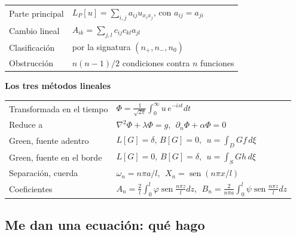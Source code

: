 \documentclass[
  spanish,
  a4paper,
]{scrbook}
\newcounter{none} %
\theoremstyle{definition}
\theoremstyle{plain}
\theoremstyle{definition}
\theoremstyle{plain}
\theoremstyle{definition}
\theoremstyle{remark}
\begin{document}
{\def\LTcaptype{none} %
\begin{longtable}[]{@{}
  >{\raggedright\arraybackslash}p{}
  >{\raggedright\arraybackslash}p{}@{}}
\toprule\noalign{}
\endhead
\bottomrule\noalign{}
\endlastfoot
Parte principal & \(L_P[u] = \sum_{i,j} a_{ij}u_{x_ix_j}\), con
\(a_{ij}=a_{ji}\) \\
Cambio lineal & \(A_{ik} = \sum_{j,l} c_{ij}c_{kl}a_{jl}\) \\
Clasificación & por la signatura \((n_+,n_-,n_0)\) \\
Obstrucción & \(n(n-1)/2\) condiciones contra \(n\) funciones \\
\end{longtable}
}

\textbf{Los tres métodos lineales}

{\def\LTcaptype{none} %
\begin{longtable}[]{@{}
  >{\raggedright\arraybackslash}p{}
  >{\raggedright\arraybackslash}p{}@{}}
\toprule\noalign{}
\endhead
\bottomrule\noalign{}
\endlastfoot
Transformada en el tiempo &
\(\Phi = \frac{1}{\sqrt{2\pi}}\int_0^\infty u\,e^{-ist}dt\) \\
Reduce a & \(\nabla^2\Phi + \lambda\Phi = g\),
\(\;\partial_n\Phi + \alpha\Phi = 0\) \\
Green, fuente adentro & \(L[G]=\delta\), \(B[G]=0\),
\(\;u = \int_D G f\,d\xi\) \\
Green, fuente en el borde & \(L[G]=0\), \(B[G]=\delta\),
\(\;u = \int_S G h\,d\xi\) \\
Separación, cuerda & \(\omega_n = n\pi a/l\),
\(\;X_n = \operatorname{sen}(n\pi x/l)\) \\
Coeficientes &
\(A_n = \frac{2}{l}\int_0^l\varphi\operatorname{sen}\frac{n\pi z}{l}dz\),
\(\;B_n = \frac{2}{n\pi a}\int_0^l\psi\operatorname{sen}\frac{n\pi z}{l}dz\) \\
\end{longtable}
}

\subsection{Me dan una ecuación: qué hago}\label{sec-resumen-11}
\end{document}
